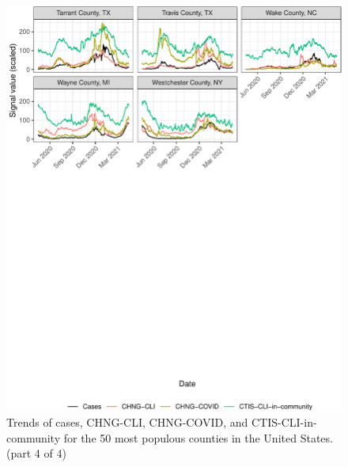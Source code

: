 \documentclass[9pt,twoside,lineno]{pnas-new}
\begin{document}
\begin{figure}

{\centering \includegraphics[width=\textwidth]{fig/county-trend-grids-4-1} 

}

\caption{Trends of cases, CHNG-CLI, CHNG-COVID, and CTIS-CLI-in-community for the 50 most populous counties in the United States. (part 4 of 4)}\label{fig:county-trend-grids-4}
\end{figure}

\clearpage
\end{document}
